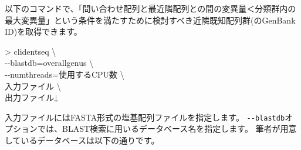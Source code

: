 \documentclass[titlepage,10pt,a4paper]{jsbook}
\newenvironment{cmd}{\begin{oframed}\raggedright\ttfamily\footnotesize\setlength{\baselineskip}{1.4em}}{\end{oframed}\vspace{-1em}}
\begin{document}
以下のコマンドで、「問い合わせ配列と最近隣配列との間の変異量＜分類群内の最大変異量」という条件を満たすために検討すべき近隣既知配列群(のGenBank ID)を取得できます。

\begin{cmd}
{\textgreater} clidentseq {\textbackslash}\\
{-}{-}blastdb=overall{\textunderscore}genus {\textbackslash}\\
{-}{-}numthreads=使用するCPU数 {\textbackslash}\\
入力ファイル {\textbackslash}\\
出力ファイル↓
\end{cmd}

入力ファイルにはFASTA形式の塩基配列ファイルを指定します。
\texttt{{-}{-}blastdb}オプションでは、BLAST検索に用いるデータベース名を指定します。
筆者が用意しているデータベースは以下の通りです。
\end{document}
